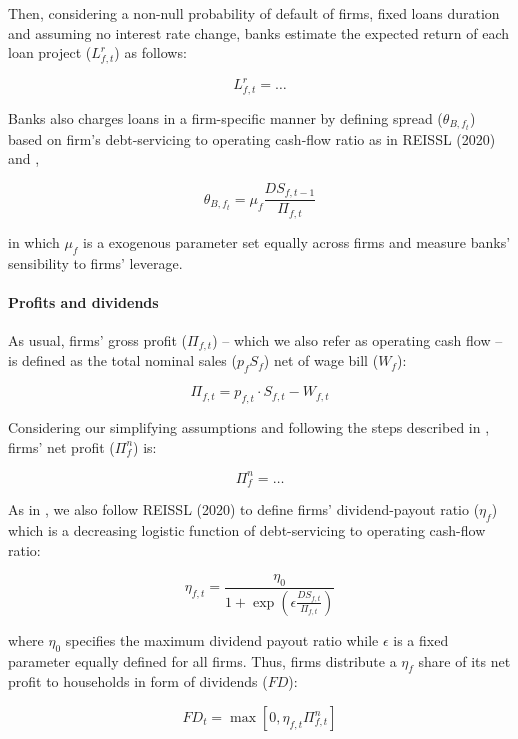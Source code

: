 \documentclass{SelfArx}
\begin{document}
Then, considering a non-null probability of default of firms, fixed loans duration and assuming no interest rate change, banks estimate the expected return of each loan project (\(L^{r}_{f,t}\)) as follows:
\begin{latex}
\begin{equation}
L^{r}_{f,t} = \ldots
\end{equation}
\end{latex}

Banks also charges loans in a firm-specific manner by defining spread (\(\theta_{B,f_{t}}\)) based on firm's debt-servicing to operating cash-flow ratio as in REISSL (2020) and \textcite{pedrosa_2021_What},
\begin{latex}
\begin{equation}
\theta_{B,f_{t}} = \mu_{f}\frac{DS_{f,t-1}}{\Pi_{f,t}}
\end{equation}
\end{latex}
in which \(\mu_{f}\) is a exogenous parameter set equally across firms and measure banks' sensibility to firms' leverage.

\paragraph*{Profits and dividends}
\label{sec:orgc569347}

As usual, firms' gross profit (\(\Pi_{f,t}\)) -- which we also refer as operating cash flow -- is defined as the total nominal sales (\(p_{f}S_{f}\)) net of wage bill (\(W_{f}\)):

\begin{latex}
\begin{equation}
\Pi_{f,t} = p_{f,t}\cdot S_{f,t} - W_{f,t}
\end{equation}
\end{latex}
Considering our simplifying assumptions and following the steps described in \textcite{pedrosa_2021_What}, firms' net profit (\(\Pi^{n}_{f}\)) is:

\begin{latex}
\begin{equation}
\Pi^{n}_{f} = \ldots
\end{equation}
\end{latex}

As in \textcite{pedrosa_2021_What}, we also follow REISSL (2020) to define firms' dividend-payout ratio (\(\eta_{f}\)) which is a decreasing logistic function of debt-servicing to operating cash-flow ratio:
\begin{latex}
\begin{equation}
\eta_{f,t} = \frac{\eta_{0}}{1+\exp\left(\epsilon\frac{DS_{f,t}}{\Pi_{f,t}}\right)}
\end{equation}
\end{latex}
where \(\eta_{0}\) specifies the maximum dividend payout ratio while \(\epsilon\) is a fixed parameter equally defined for all firms.
Thus, firms distribute a \(\eta_{f}\) share of its net profit to households in form of dividends (\(FD\)):
\begin{latex}
\begin{equation}
FD_{t} = \max [0,\eta_{f,t}\Pi_{f,t}^{n}]
\end{equation}
\end{latex}
\end{document}
